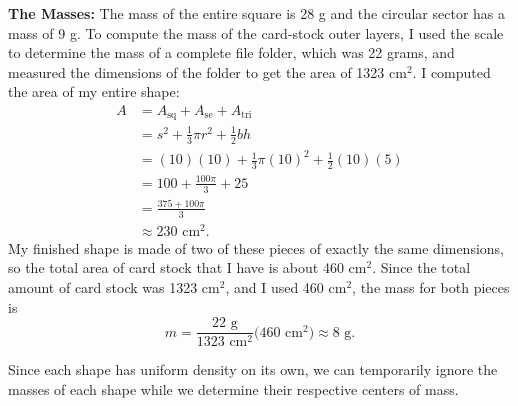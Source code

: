 \documentclass[12pt]{amsart}
\begin{document}
{\bf The Masses:} The mass of the entire square is 28 g and the circular sector has a mass of 9 g.  To compute the mass of the card-stock outer layers, I used the scale to determine the mass of a complete file folder, which was 22 grams, and measured the dimensions of the folder to get the area of 1323 cm$^2$.  I computed the area of my entire shape:
\begin{align*}A & = A_{\text{sq}} + A_{\text{se}} + A_{\text{tri}}\\
& = s^2 + \frac{1}{3}\pi r^2 + \frac{1}{2}bh\\
& = (10)(10) + \frac{1}{3}\pi(10)^2 + \frac{1}{2}(10)(5)\\
& = 100 + \frac{100\pi}{3} + 25\\
& = \frac{375 + 100\pi}{3}\\
& \approx 230\text{ cm}^2.
\end{align*}
My finished shape is made of two of these pieces of exactly the same dimensions, so the total area of card stock that I have is about 460 cm$^2$. Since the total amount of card stock was 1323 cm$^2$, and I used 460 cm$^2$, the mass for both pieces is
$$m = \frac{22\text{ g}}{1323\text{ cm}^2}\big(460\text{ cm}^2\big) \approx 8\text{ g}.$$

Since each shape has uniform density on its own, we can temporarily ignore the masses of each shape while we determine their respective centers of mass.

\bigskip
\end{document}
